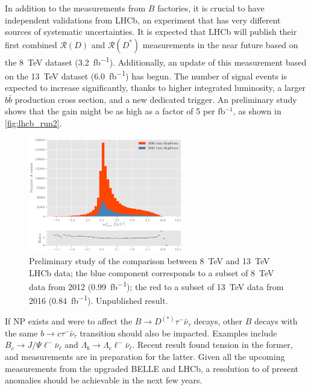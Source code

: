 \documentclass[12pt,letterpaper]{article}
\newcommand{\PRLrule}{
    \bigskip
    \noindent\makebox[\linewidth]{
        \resizebox{0.3333\linewidth}{1pt}{$\blacklozenge$}
    }
    \bigskip
}
\def\RD/{\ensuremath{\mathcal{R}(D)}}
\def\RDst/{\ensuremath{\mathcal{R}(D^{*})}}
\def\DDst/{\ensuremath{D^{(*)}}}
\newcommand{\BMesonMode}[2]{\ensuremath{
    B \rightarrow #2 #1^- \bar{\nu}_#1
}}
\newcommand{\BDDstMode}[1]{\BMesonMode{#1}{\DDst/}}
\begin{document}
In addition to the measurements from $B$ factories, it is crucial to have
independent validations from LHCb, an experiment that has very different sources
of systematic uncertainties.
It is expected that LHCb will publish their first combined \RD/ and \RDst/
measurements in the near future based on the \SI{8}{TeV} dataset
(\SI{3.2}{fb^{-1}}).
Additionally, an update of this measurement based on the \SI{13}{TeV} dataset
(\SI{6.0}{fb^{-1}}) has begun.
The number of signal events is expected to increase significantly, thanks to
higher integrated luminosity, a larger $b \bar{b}$ production cross section, and
a new dedicated trigger.
An preliminary study shows that the gain might be as high as a factor of 5 per
fb$^{-1}$, as shown in \autoref{fig:lhcb_run2}.

\begin{figure}[ht]
    \centering
    \includegraphics[width=0.6\textwidth]{figs/lhcb_run2.pdf}
    \caption{
        Preliminary study of the comparison between \SI{8}{TeV} and \SI{13}{TeV}
        LHCb data;
        the blue component corresponds to a subset of \SI{8}{TeV} data from 2012
        (\SI{0.99}{fb^{-1}});
        the red to a subset of \SI{13}{TeV} data from 2016 (\SI{0.84}{fb^{-1}}).
        Unpublished result.
    }
    \label{fig:lhcb_run2}
\end{figure}

If NP exists and were to affect the \BDDstMode{\tau} decays, other $B$ decays
with the same $b \rightarrow c \tau^- \bar{\nu}_\tau$ transition should also be
impacted.
Examples include $B_c \rightarrow J/\Psi \ell^- \bar{\nu}_\ell$ and
$\Lambda_b \rightarrow \Lambda_c \ell^- \bar{\nu}_\ell$.
Recent result \cite{Aaij:2017tyk} found tension in the former, and measurements
are in preparation for the latter.
Given all the upcoming measurements from the upgraded BELLE and LHCb, a
resolution to of present anomalies should be achievable in the next few years.

\FloatBarrier
\PRLrule
\printbibliography
\end{document}
